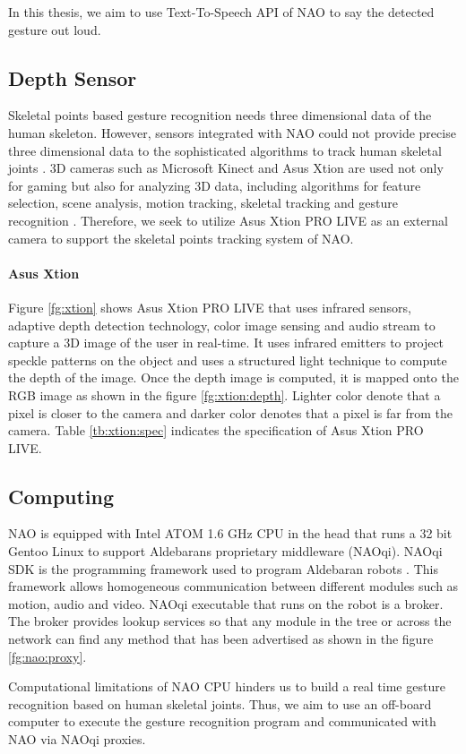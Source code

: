 In this thesis, we aim to use Text-To-Speech API of NAO to say the detected gesture out loud.

\subsection{Depth Sensor} \label{sec:nao:vision} Skeletal points based gesture recognition needs three dimensional data of the human skeleton. However, sensors integrated with NAO could not provide precise three dimensional data to the sophisticated algorithms to track human skeletal joints \cite{17}. 3D cameras such as Microsoft Kinect and Asus Xtion are used not only for gaming but also for analyzing 3D data, including algorithms for feature selection, scene analysis, motion tracking, skeletal tracking and gesture recognition \cite{9} \cite{18}. Therefore, we seek to utilize Asus Xtion PRO LIVE as an external camera to support the skeletal points tracking system of NAO. 





\paragraph*{Asus Xtion} Figure \ref{fg:xtion} shows Asus Xtion PRO LIVE that uses infrared sensors, adaptive depth detection technology, color image sensing and audio stream to capture a 3D image of the user in real-time. It uses infrared emitters to project speckle patterns on the object and uses a structured light technique to compute the depth of the image. Once the depth image is computed, it is mapped onto the RGB image as shown in the figure \ref{fg:xtion:depth}. Lighter color denote that a pixel is closer to the camera and darker color denotes that a pixel is far from the camera. Table \ref{tb:xtion:spec} indicates the specification of Asus Xtion PRO LIVE.



\subsection{Computing} NAO is equipped with Intel ATOM 1.6 GHz CPU in the head that runs a 32 bit Gentoo Linux to support Aldebarans proprietary middleware (NAOqi). NAOqi SDK is the programming framework used to program Aldebaran robots \cite{8}. This framework allows homogeneous communication between different modules such as motion, audio and video. NAOqi executable that runs on the robot is a broker. The broker provides lookup services so that any module in the tree or across the network can find any method that has been advertised as shown in the figure \ref{fg:nao:proxy}.



Computational limitations \cite{17} of NAO CPU hinders us to build a real time gesture recognition based on human skeletal joints. Thus, we aim to use an off-board computer to execute the gesture recognition program and communicated with NAO via NAOqi proxies. 
